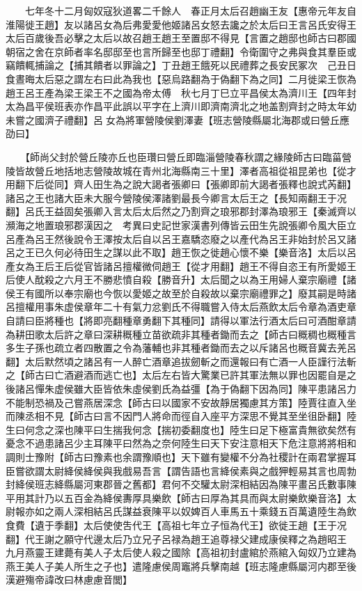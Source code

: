 　　七年冬十二月匈奴寇狄道畧二千餘人　春正月太后召趙幽王友【惠帝元年友自淮陽徙王趙】友以諸呂女為后弗愛愛他姬諸呂女怒去讒之於太后曰王言呂氏安得王太后百歲後吾必擊之太后以故召趙王趙王至置邸不得見【言置之趙邸也師古曰郡國朝宿之舍在京師者率名邸邸至也言所歸至也邸丁禮翻】令衛圍守之弗與食其羣臣或竊饋輒捕論之【捕其饋者以罪論之】丁丑趙王餓死以民禮葬之長安民冢次　己丑日食晝晦太后惡之謂左右曰此為我也【惡烏路翻為于偽翻下為之同】二月徙梁王恢為趙王呂王產為梁王梁王不之國為帝太傅　秋七月丁巳立平昌侯太為濟川王【四年封太為昌平侯班表亦作昌平此誤以平字在上濟川即濟南濟北之地盖割齊封之時太年幼未嘗之國濟子禮翻】呂女為將軍營陵侯劉澤妻【班志營陵縣屬北海郡或曰營丘應劭曰】

　　【師尚父封於營丘陵亦丘也臣瓚曰營丘即臨淄營陵春秋謂之緣陵師古曰臨菑營陵皆故營丘地括地志營陵故城在青州北海縣南三十里】澤者高祖從祖昆弟也【從才用翻下后從同】齊人田生為之說大謁者張卿曰【張卿即前大謁者張釋也說式芮翻】諸呂之王也諸大臣未大服今營陵侯澤諸劉最長今卿言太后王之【長知兩翻王于况翻】呂氏王益固矣張卿入言太后太后然之乃割齊之琅邪郡封澤為琅邪王【秦滅齊以瀕海之地置琅邪郡漢因之　考異曰史記世家漢書列傳皆云田生先說張卿令風大臣立呂產為呂王然後說令王澤按太后自以呂王嘉驕恣廢之以產代為呂王非始封於呂又諸呂之王已久何必待田生之謀以此不取】趙王恢之徙趙心懷不樂【樂音洛】太后以呂產女為王后王后從官皆諸呂擅權微伺趙王【從才用翻】趙王不得自恣王有所愛姬王后使人酖殺之六月王不勝悲憤自殺【勝音升】太后聞之以為王用婦人棄宗廟禮【諸侯王有國所以奉宗廟也今恢以愛姬之故至於自殺故以棄宗廟禮罪之】廢其嗣是時諸呂擅權用事朱虚侯章年二十有氣力忿劉氏不得職嘗入侍太后燕飲太后令章為酒吏章自請曰臣將種也【將即亮翻種章勇翻下其種同】請得以軍法行酒太后曰可酒酣章請為耕田歌太后許之章曰深耕穊種立苗欲疏非其種者鋤而去之【師古曰穊稠也穊種言多生子孫也疏立者四散置之令為藩輔也非其種者鋤而去之以斥諸呂也穊音冀去羌呂翻】太后默然頃之諸呂有一人醉亡酒章追拔劒斬之而還報曰有亡酒一人臣謹行法斬之【師古曰亡酒避酒而逃亡也】太后左右皆大驚業已許其軍法無以罪也因罷自是之後諸呂憚朱虚侯雖大臣皆依朱虛侯劉氏為益彊【為于偽翻下因為同】陳平患諸呂力不能制恐禍及己嘗燕居深念【師古曰以國家不安故靜居獨慮其方策】陸賈往直入坐而陳丞相不見【師古曰言不因門人將命而徑自入座平方深思不覺其至坐徂卧翻】陸生曰何念之深也陳平曰生揣我何念【揣初委翻度也】陸生曰足下極富貴無欲矣然有憂念不過患諸呂少主耳陳平曰然為之奈何陸生曰天下安注意相天下危注意將將相和調則士豫附【師古曰豫素也余謂豫順也】天下雖有變權不分為社稷計在兩君掌握耳臣嘗欲謂太尉絳侯絳侯與我戲易吾言【謂告語也言絳侯素與之戲狎輕易其言也周勃封絳侯班志絳縣屬河東郡晉之舊都】君何不交驩太尉深相結因為陳平畫呂氏數事陳平用其計乃以五百金為絳侯夀厚具樂飲【師古曰厚為其具而與太尉樂飲樂音洛】太尉報亦如之兩人深相結呂氏謀益衰陳平以奴婢百人車馬五十乘錢五百萬遺陸生為飲食費【遺于季翻】太后使使吿代王【高祖七年立子恒為代王】欲徙王趙【王于况翻】代王謝之願守代邊太后乃立兄子呂禄為趙王追尊禄父建成康侯釋之為趙昭王　九月燕靈王建薨有美人子太后使人殺之國除【高祖初封盧綰於燕綰入匈奴乃立建為燕王美人子美人所生之子也】遣隆慮侯周竈將兵擊南越【班志隆慮縣屬河内郡至後漢避殤帝諱改曰林慮慮音閭】

